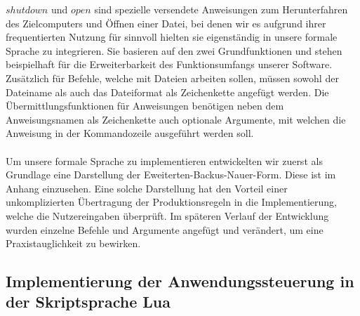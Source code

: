$shutdown$ und $open$ sind spezielle versendete Anweisungen zum Herunterfahren des Zielcomputers und Öffnen einer Datei, bei denen wir es aufgrund ihrer frequentierten Nutzung für sinnvoll hielten sie eigenständig in unsere formale Sprache zu integrieren. Sie basieren auf den zwei Grundfunktionen und stehen beispielhaft für die Erweiterbarkeit des Funktionsumfangs unserer Software. 
Zusätzlich für Befehle, welche mit Dateien arbeiten sollen, müssen sowohl der Dateiname als auch das Dateiformat als Zeichenkette angefügt werden. 
Die Übermittlungsfunktionen für Anweisungen benötigen neben dem Anweisungsnamen als Zeichenkette auch optionale Argumente, mit welchen die Anweisung in der Kommandozeile ausgeführt werden soll.\\\\
Um unsere formale Sprache zu implementieren entwickelten wir zuerst als Grundlage eine Darstellung der Eweiterten-Backus-Nauer-Form. Diese ist im Anhang einzusehen. Eine solche Darstellung hat den Vorteil einer unkomplizierten Übertragung der Produktionsregeln in die Implementierung, welche die Nutzereingaben überprüft. Im späteren Verlauf der Entwicklung wurden einzelne Befehle und Argumente angefügt und verändert, um eine Praxistauglichkeit zu bewirken.

\subsection{Implementierung der Anwendungssteuerung in der Skriptsprache Lua}

